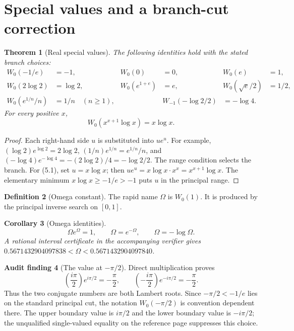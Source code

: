 \documentclass[11pt]{article}
\newtheorem{theorem}{Theorem}[section]
\newtheorem{corollary}[theorem]{Corollary}
\theoremstyle{definition}
\newtheorem{definition}[theorem]{Definition}
\newtheorem{audit}[theorem]{Audit finding}
\newcommand{\Wz}{W_0}
\newcommand{\Wm}{W_{-1}}
\begin{document}
\section{Special values and a branch-cut correction}\label{sec:special}

\begin{theorem}[Real special values]\label{thm:special-values}
The following identities hold with the stated branch choices:
\begin{align*}
 \Wz(-1/e)&=-1,& \Wz(0)&=0,& \Wz(e)&=1,\\
 \Wz(2\log2)&=\log2,&
 \Wz(e^{1+e})&=e,&
 \Wz(\sqrt e/2)&=1/2,\\
 \Wz(e^{1/n}/n)&=1/n\quad(n\ge1),&&
 \Wm(-\log2/2)&=-\log4.
\end{align*}
For every positive \(x\),
\[
 \Wz(x^{x+1}\log x)=x\log x.
 \tag{5.1}
\]
\end{theorem}

\begin{proof}
Each right-hand side \(u\) is substituted into \(ue^u\).  For example,
\((\log2)e^{\log2}=2\log2\),
\((1/n)e^{1/n}=e^{1/n}/n\), and
\((-\log4)e^{-\log4}=-(2\log2)/4=-\log2/2\).  The range condition selects the
branch.  For (5.1), set \(u=x\log x\); then
\(ue^u=x\log x\cdot x^x=x^{x+1}\log x\).  The elementary minimum
\(x\log x\ge-1/e>-1\) puts \(u\) in the principal range.
\end{proof}

\begin{definition}[Omega constant]
The rapid name \(\Omega\) is \(\Wz(1)\).  It is produced by the principal
inverse search on \([0,1]\).
\end{definition}

\begin{corollary}[Omega identities]\label{cor:omega}
\[
 \Omega e^\Omega=1,
 \qquad \Omega=e^{-\Omega},
 \qquad \Omega=-\log\Omega.
 \tag{5.2}
\]
A rational interval certificate in the accompanying verifier gives
\(0.5671432904097838<\Omega<0.5671432904097840\).
\end{corollary}

\begin{audit}[The value at \(-\pi/2\)]\label{audit:pi-cut}
Direct multiplication proves
\[
 \left(\frac{i\pi}{2}\right)e^{i\pi/2}=-\frac\pi2,
 \qquad
 \left(-\frac{i\pi}{2}\right)e^{-i\pi/2}=-\frac\pi2.
\]
Thus the two conjugate numbers are both Lambert roots.  Since
\(-\pi/2<-1/e\) lies on the standard principal cut, the notation
\(W_0(-\pi/2)\) is convention dependent there.  The upper boundary value is
\(i\pi/2\) and the lower boundary value is \(-i\pi/2\); the unqualified
single-valued equality on the reference page suppresses this choice.
\end{audit}
\end{document}
